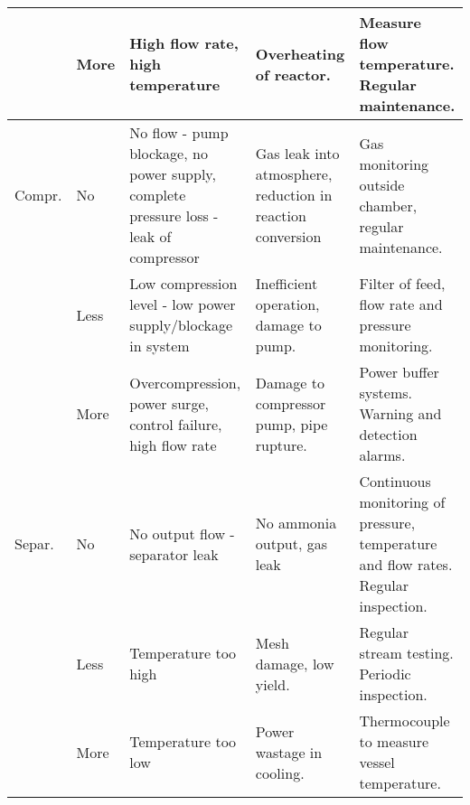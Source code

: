 {\begin{landscape}
\begin{table}
\begin{tabular}{|p{1.5cm}|p{1.2cm}|p{5.7cm}|p{5.2cm}|p{8.2cm}|}
				\hline
				& More      & High flow rate, high temperature                                                                      & Overheating of reactor.                                  & Measure flow temperature. Regular maintenance.                                                                                  \\ 
				\hline
				Compr.     & No        & No flow - pump blockage, no power supply, complete pressure loss - leak of compressor                 & Gas leak into atmosphere, reduction in reaction conversion               & Gas monitoring outside chamber, regular maintenance.                                                                               \\ 
				\hline
				& Less      & Low compression level - low power supply/blockage in system                                           & Inefficient operation, damage to pump.                                   & Filter of feed, flow rate and pressure monitoring.                                                                                 \\ 
				\hline
				& More      & Overcompression, power surge, control failure, high flow rate                                         & Damage to compressor pump, pipe rupture. & Power buffer systems. Warning and detection alarms.                                                                                \\ 
				\hline
				Separ.      & No        & No output flow - separator leak                                                                       & No ammonia output, gas leak                                              & Continuous monitoring of pressure, temperature and flow rates. Regular inspection.                                                 \\ 
				\hline
				& Less      & Temperature too high                                                                                  & Mesh damage, low yield.                                       & Regular stream testing. Periodic inspection.                                                                  \\ 
				\hline
				& More      & Temperature too low                                                                                   & Power wastage in cooling.                                        & Thermocouple to measure vessel temperature.                                                                                 \\ 

\end{tabular}
\end{table}
\end{landscape}}
